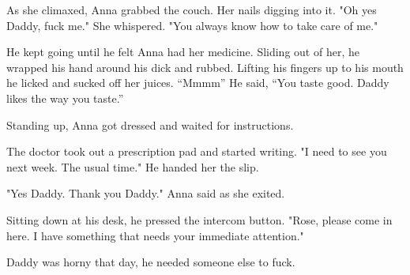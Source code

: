      As she climaxed, Anna grabbed the 
couch. Her nails digging into it. "Oh yes 
Daddy, fuck me." She whispered. "You 
always know how to take care of me." 

     He kept going until he felt Anna had her 
medicine. Sliding out of her, he wrapped his 
hand around his dick and rubbed. Lifting 
his fingers up to his mouth he licked and 
sucked off her juices. “Mmmm” He said, 
“You taste good. Daddy likes the way you 
taste.” 

     Standing up, Anna got dressed and 
waited for instructions. 

     The doctor took out a prescription pad 
and started writing. "I need to see you next 
week. The usual time." He handed her the 
slip. 

     "Yes Daddy. Thank you Daddy." Anna 
said as she exited. 

     Sitting down at his desk, he pressed the 
intercom button. "Rose, please come in 
here. I have something that needs your 
immediate attention." 

     Daddy was horny that day, he needed 
someone else to fuck.

